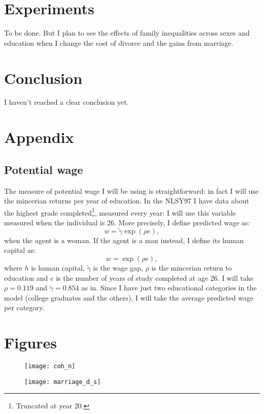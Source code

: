 \documentclass[12pt]{article}
\begin{document}
\section{Experiments}
To be done. But I plan to see the effects of family inequalities across sexes and education when I change the cost of divorce and the gains from marriage.
\section{Conclusion}
I haven't reached a clear conclusion yet. 


\newpage
\section*{Appendix}
 \subsection*{Potential wage}
 The measure of potential wage I will be using is straightforward: in fact I will use the mincerian returns per year of education. In the NLSY97 I have data about the highest grade completed\footnote{Truncated at year 20.}, measured every year: I will use this variable measured when the individual is 26. More precisely, I define predicted wage as:
 \[
 w=\tilde{\gamma}\exp(\rho e),
 \]
 when the agent is a woman. If the agent is a man instead, I define its human capital as:
 \[
 w=\exp(\rho e),
 \]
 where $h$ is human capital, $\tilde{\gamma}$ is the wage gap, $\rho$ is the mincerian return to education and  $e$ is the number of years of study completed at age 26. I will take $\rho=0.119$ and $\tilde{\gamma}=0.854$ as in\citet{baudin2015}. Since I have just two educational categories in the model (college graduates and the others), I will take the average predicted wage per category.
\section*{Figures}
\begin{figure}[H]
\centering
\texttt{[image: coh\_n]}
\caption{}
\label{fig:cohn}
\end{figure}



\begin{figure}[H]
	\centering
	\texttt{[image: marriage\_d\_s]}
	\caption{}
	\label{fig:marriage_d_s}
\end{figure}
\end{document}
